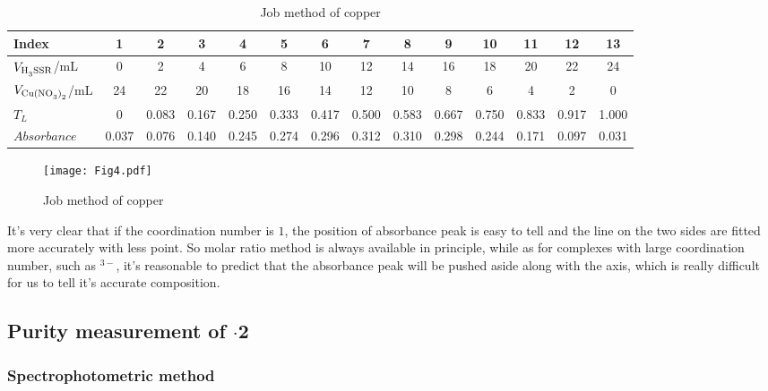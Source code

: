\begin{table}[H]
	\caption{Job method of copper}
	\label{Tab.Jbm2}
	\begin{tabular}{lccccccccccccc}
	\toprule
	Index					&1		&2		&3		&4		&5		&6		&7		&8		&9		&10		&11		&12		&13\\
	\midrule
	$V_{\ce{H3SSR}}$/mL 	&0		&2		&4		&6		&8		&10		&12		&14		&16		&18		&20		&22		&24\\
	$V_{\ce{Cu(NO3)2}}$/mL  &24		&22		&20		&18		&16		&14		&12		&10		&8		&6		&4		&2		&0	\\
	$T_L$					&0		&0.083	&0.167	&0.250	&0.333	&0.417	&0.500	&0.583	&0.667	&0.750	&0.833	&0.917	&1.000\\
	$Absorbance$ 			&0.037	&0.076	&0.140	&0.245	&0.274	&0.296	&0.312	&0.310	&0.298	&0.244	&0.171	&0.097	&0.031\\
	\bottomrule
	\end{tabular}
\end{table}

\begin{figure}[H]
	\texttt{[image: Fig4.pdf]}
	\caption{Job method of copper}
	\label{fig4}
\end{figure}

It's very clear that if the coordination number is $1$, the position of absorbance peak is easy to tell and the line on the two sides are fitted more accurately with less point. So molar ratio method is always available in principle, while as for complexes with large coordination number, such as \ce{[Fe(CN)6]}$^{3-}$, it's reasonable to predict that the absorbance peak will be pushed aside along with the axis, which is really difficult for us to tell it's accurate composition.


\subsection{Purity measurement of $\cdot$2}

\subsubsection{Spectrophotometric method}

